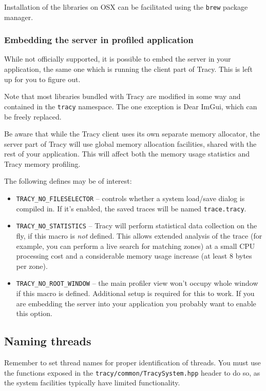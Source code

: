 \documentclass[hidelinks,titlepage,a4paper]{article}
\begin{document}
Installation of the libraries on OSX can be facilitated using the \texttt{brew} package manager.

\subsubsection{Embedding the server in profiled application}
\label{embeddingserver}

While not officially supported, it is possible to embed the server in your application, the same one which is running the client part of Tracy. This is left up for you to figure out.

Note that most libraries bundled with Tracy are modified in some way and contained in the \texttt{tracy} namespace. The one exception is Dear ImGui, which can be freely replaced.

Be aware that while the Tracy client uses its own separate memory allocator, the server part of Tracy will use global memory allocation facilities, shared with the rest of your application. This will affect both the memory usage statistics and Tracy memory profiling.

The following defines may be of interest:

\begin{itemize}
\item \texttt{TRACY\_NO\_FILESELECTOR} -- controls whether a system load/save dialog is compiled in. If it's enabled, the saved traces will be named \texttt{trace.tracy}.
\item \texttt{TRACY\_NO\_STATISTICS} -- Tracy will perform statistical data collection on the fly, if this macro is \emph{not} defined. This allows extended analysis of the trace (for example, you can perform a live search for matching zones) at a small CPU processing cost and a considerable memory usage increase (at least 8 bytes per zone).
\item \texttt{TRACY\_NO\_ROOT\_WINDOW} -- the main profiler view won't occupy whole window if this macro is defined. Additional setup is required for this to work. If you are embedding the server into your application you probably want to enable this option.
\end{itemize}

\subsection{Naming threads}

Remember to set thread names for proper identification of threads. You must use the functions exposed in the \texttt{tracy/common/TracySystem.hpp} header to do so, as the system facilities typically have limited functionality.
\end{document}
